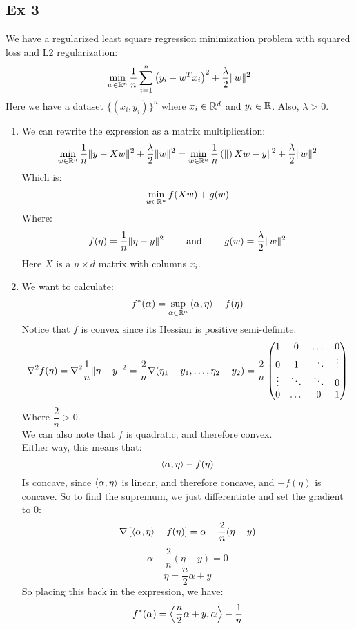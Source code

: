 \documentclass[12pt]{article}
\begin{document}
\newpage

\subsection*{Ex 3}
We have a regularized least square regression
minimization problem with squared loss and L2
regularization:
\[ \min_{w \in \mathbb{R}^n} \dfrac{1}{n}\sum_{i=1}^n 
\left( y_i - w^Tx_i \right)^2 + \dfrac{\lambda}{2}\|w\|^2 \]
Here we have a dataset $\{(x_i, y_i)\}^n$
where $x_i \in \mathbb{R}^d$ and $y_i \in \mathbb{R}$.
Also, $\lambda > 0$. \\
\begin{enumerate}[label = \letters]
    \item 
    We can rewrite the expression as a matrix
    multiplication:
    \[ \min_{w \in \mathbb{R}^n} \dfrac{1}{n}\|y - Xw\|^2
    + \dfrac{\lambda}{2}\|w\|^2
    = \min_{w \in \mathbb{R}^n} \dfrac{1}{n}\left( \| \right)Xw - y\|^2
    + \dfrac{\lambda}{2}\|w\|^2 \]
    Which is:
    \[ \min_{w \in \mathbb{R}^n} f(Xw) + g(w) \]
    Where:
    \[ f(\eta) = \dfrac{1}{n}\|\eta - y\|^2
    \qquad \text{ and } \qquad g(w) = \dfrac{\lambda}{2}\|w\|^2 \]
    Here $X$ is a $n\times d$ matrix with columns $x_i$. \\
    \item 
    We want to calculate:
    \[ f^*(\alpha) = \sup_{\alpha \in \mathbb{R}^n} 
    \left\langle \alpha, \eta \right\rangle - f(\eta) \]
    Notice that $f$ is convex since its Hessian
    is positive semi-definite:
    \[ \nabla^2 f(\eta) 
    = \nabla^2 \dfrac{1}{n}\|\eta - y\|^2
    = \dfrac{2}{n} \nabla (\eta_1 - y_1, \dots, 
    \eta_2 - y_2)
    = \dfrac{2}{n}\begin{pmatrix} 1 & 0 & \dots & 0 \\
    0 & 1 & \ddots & \vdots \\
    \vdots & \ddots & \ddots & 0 \\
    0 & \dots & 0 & 1 \end{pmatrix} \]
    Where $\dfrac{2}{n} > 0$. \\
    We can also note that $f$ is quadratic, and therefore
    convex. \\
    Either way, this means that:
    \[ \left\langle \alpha, \eta \right\rangle - f(\eta) \]
    Is concave, since $\left\langle \alpha, \eta \right\rangle$
    is linear, and therefore concave, and $-f(\eta)$
    is concave. So to find the supremum, we just
    differentiate and set the gradient to $0$:
    \[ \nabla \left[ \left\langle \alpha, \eta \right\rangle - f(\eta) \right] 
    = \alpha - \dfrac{2}{n} (\eta - y) \]
    \[ \alpha - \dfrac{2}{n} (\eta - y) = 0 \]
    \[ \eta = \dfrac{n}{2}\alpha + y \]
    So placing this back in the expression, we have:
    \[ f^*(\alpha) = \left\langle \dfrac{n}{2}\alpha + y, 
    \alpha \right\rangle - \dfrac{1}{n}
\]
\end{enumerate}
\end{document}
